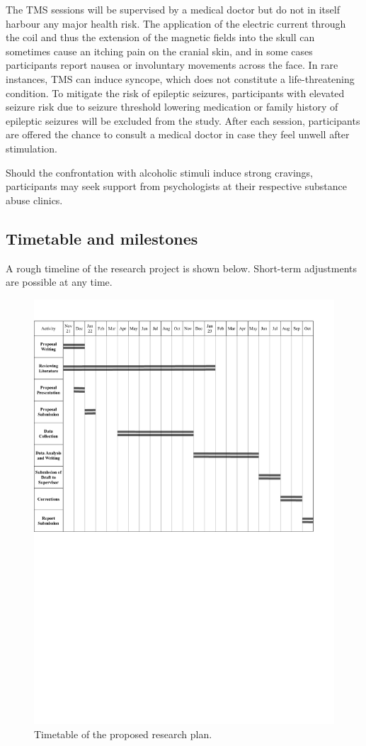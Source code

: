 \documentclass[12pt]{article}
\begin{document}
The TMS sessions will be supervised by a medical doctor but do not in itself harbour any major health risk. The application of the electric current through the coil and thus the extension of the magnetic fields into the skull can sometimes cause an itching pain on the cranial skin, and in some cases participants report nausea or involuntary movements across the face. In rare instances, TMS can induce syncope, which does not constitute a life-threatening condition. To mitigate the risk of epileptic seizures, participants with elevated seizure risk due to seizure threshold lowering medication or family history of epileptic seizures will be excluded from the study. After each session, participants are offered the chance to consult a medical doctor in case they feel unwell after stimulation. 

Should the confrontation with alcoholic stimuli induce strong cravings, participants may seek support from psychologists at their respective substance abuse clinics.

\subsection{Timetable and milestones}
A rough timeline of the research project is shown below. Short-term adjustments are possible at any time.

\begin{figure}[h]
\includegraphics[width=\textwidth,keepaspectratio]{Timetable2.pdf}
\caption{Timetable of the proposed research plan.}
\end{figure}
\end{document}

